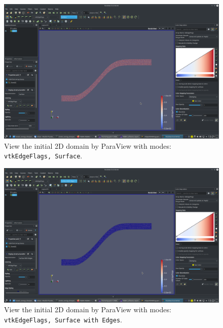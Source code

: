 \documentclass[onsided]{book}
\numberwithin{equation}{section}
\begin{document}
\begin{enumerate}
\begin{enumerate}
        \begin{figure}[H]
            \centering
            \includegraphics[height=0.44\textheight]{initial_domain_2D_vtkEdgeFlags_Surface}
            \caption{View the initial 2D domain by ParaView with modes: \texttt{vtkEdgeFlags, Surface}.}
        \end{figure}
        
        \begin{figure}[H]
            \centering
            \includegraphics[height=0.44\textheight]{initial_domain_2D_vtkEdgeFlags_Surface_with_Edges}
            \caption{View the initial 2D domain by ParaView with modes: \texttt{vtkEdgeFlags, Surface with Edges}.}
        \end{figure}
        

\end{enumerate}
\end{enumerate}
\end{document}
